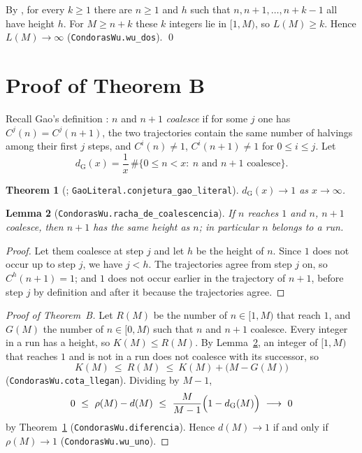 \documentclass[11pt]{amsart}
\newtheorem{theorem}{Theorem}[section]
\newtheorem{lemma}[theorem]{Lemma}
\theoremstyle{definition}
\theoremstyle{remark}
\newcommand{\lean}[1]{\nolinkurl{#1}}
\begin{document}
By \cite[Theorem~1.1]{SaidGarner}, for every $k\ge1$ there are $n\ge1$ and $h$ such that $n,n+1,\dots,n+k-1$ all have height $h$. For $M\ge n+k$ these $k$ integers lie in $[1,M)$, so $L(M)\ge k$. Hence $L(M)\to\infty$ (\lean{CondorasWu.wu_dos}). \qed

\section{Proof of Theorem B}\label{sec:B}

Recall Gao's definition \cite[p.~264]{Gao93}: $n$ and $n+1$ \emph{coalesce} if for some $j$ one has $C^{j}(n)=C^{j}(n+1)$, the two trajectories contain the same number of halvings among their first $j$ steps, and $C^{i}(n)\ne1$, $C^{i}(n+1)\ne1$ for $0\le i\le j$. Let
\[
d_{\mathrm G}(x)=\frac1x\,\#\{0\le n<x:\ n \text{ and } n+1 \text{ coalesce}\}.
\]

\begin{theorem}[{\cite[Theorem~B]{SaidGao}; \lean{GaoLiteral.conjetura_gao_literal}}]\label{thm:gao}
$d_{\mathrm G}(x)\to1$ as $x\to\infty$.
\end{theorem}

\begin{lemma}[\lean{CondorasWu.racha_de_coalescencia}]\label{lem:coal}
If $n$ reaches $1$ and $n$, $n+1$ coalesce, then $n+1$ has the same height as $n$; in particular $n$ belongs to a run.
\end{lemma}

\begin{proof}
Let them coalesce at step $j$ and let $h$ be the height of $n$. Since $1$ does not occur up to step $j$, we have $j<h$. The trajectories agree from step $j$ on, so $C^{h}(n+1)=1$; and $1$ does not occur earlier in the trajectory of $n+1$, before step $j$ by definition and after it because the trajectories agree.
\end{proof}

\begin{proof}[Proof of Theorem~B]
Let $R(M)$ be the number of $n\in[1,M)$ that reach $1$, and $G(M)$ the number of $n\in[0,M)$ such that $n$ and $n+1$ coalesce. Every integer in a run has a height, so $K(M)\le R(M)$. By Lemma~\ref{lem:coal}, an integer of $[1,M)$ that reaches $1$ and is not in a run does not coalesce with its successor, so
\[
K(M)\ \le\ R(M)\ \le\ K(M)+\bigl(M-G(M)\bigr)
\]
(\lean{CondorasWu.cota_llegan}). Dividing by $M-1$,
\[
0\ \le\ \rho(M)-d(M)\ \le\ \frac{M}{M-1}\Bigl(1-d_{\mathrm G}(M)\Bigr)\ \longrightarrow\ 0
\]
by Theorem~\ref{thm:gao} (\lean{CondorasWu.diferencia}). Hence $d(M)\to1$ if and only if $\rho(M)\to1$ (\lean{CondorasWu.wu_uno}).
\end{proof}
\end{document}
